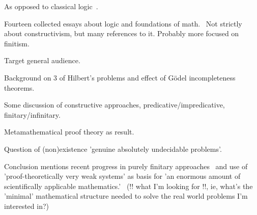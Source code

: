 \cite{Feferman:2000,Diez:2002,sep:mathematics_constructive,
wiki:Constructivism_philosophy_of_mathematics}

As opposed to classical logic~\cite{wiki:Classical_logic}.

\label{sec:Feferman}
\cite{Feferman1998LightOfLogic,Feferman:2000}

\label{sec:In_the_light_of_logic}

Fourteen collected essays about logic and foundations of 
math.~\cite{Feferman1998LightOfLogic}
Not strictly about constructivism, but many references to it.
Probably more focused on finitism.

\label{sec:Deciding_the_undecidable}

\cite[ch.~1 ``Deciding the undecidable'']{Feferman1998LightOfLogic}

Target general audience.

Background on $3$ of Hilbert's problems
and effect of G\"{o}del incompleteness theorems.

Some discussion of constructive approaches, 
predicative/impredicative, finitary/infinitary.

Metamathematical proof theory as result.

Question of (non)existence 
'genuine absolutely undecidable problems'.

Conclusion mentions recent progress
in purely finitary approaches~\cite[ch.~10]{Feferman1998LightOfLogic}
and 
use of 'proof-theoretically very weak systems'
as basis for 'an enormous amount of scientifically applicable
mathematics.'~\cite[ch.~14]{Feferman1998LightOfLogic}
(!! what I'm looking for !!, ie, 
what's the 'minimal' mathematical structure needed to
solve the real world problems I'm interested in?)

\label{sec:Is_Cantor_Necessary}

\cite{feferman_1989_cantor_necessary}
\cite[ch.~2 ``Is Cantor necessary?'']{Feferman1998LightOfLogic}

